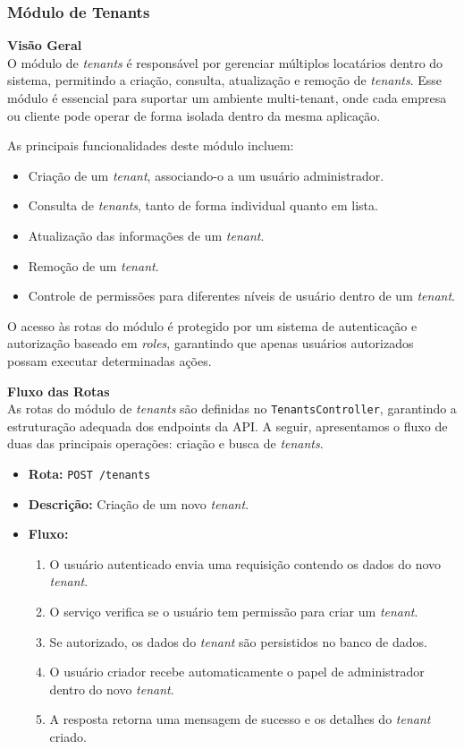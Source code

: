 \subsubsection{Módulo de Tenants}\label{subsubsec:modulo_tenants}

\textbf{Visão Geral} \\
O módulo de \textit{tenants} é responsável por gerenciar múltiplos locatários dentro do sistema, permitindo a criação, consulta, atualização e remoção de \textit{tenants}. Esse módulo é essencial para suportar um ambiente multi-tenant, onde cada empresa ou cliente pode operar de forma isolada dentro da mesma aplicação.

As principais funcionalidades deste módulo incluem:

\begin{itemize}
    \item Criação de um \textit{tenant}, associando-o a um usuário administrador.
    \item Consulta de \textit{tenants}, tanto de forma individual quanto em lista.
    \item Atualização das informações de um \textit{tenant}.
    \item Remoção de um \textit{tenant}.
    \item Controle de permissões para diferentes níveis de usuário dentro de um \textit{tenant}.
\end{itemize}

O acesso às rotas do módulo é protegido por um sistema de autenticação e autorização baseado em \textit{roles}, garantindo que apenas usuários autorizados possam executar determinadas ações.

\textbf{Fluxo das Rotas} \\
As rotas do módulo de \textit{tenants} são definidas no \texttt{TenantsController}, garantindo a estruturação adequada dos endpoints da API. A seguir, apresentamos o fluxo de duas das principais operações: criação e busca de \textit{tenants}.

\begin{itemize}
	\item \textbf{Rota:} \texttt{POST /tenants}
	\item \textbf{Descrição:} Criação de um novo \textit{tenant}.
	\item \textbf{Fluxo:}
	\begin{enumerate}
    \item O usuário autenticado envia uma requisição contendo os dados do novo \textit{tenant}.
    \item O serviço verifica se o usuário tem permissão para criar um \textit{tenant}.
    \item Se autorizado, os dados do \textit{tenant} são persistidos no banco de dados.
    \item O usuário criador recebe automaticamente o papel de administrador dentro do novo \textit{tenant}.
    \item A resposta retorna uma mensagem de sucesso e os detalhes do \textit{tenant} criado.
	\end{enumerate}
\end{itemize}

